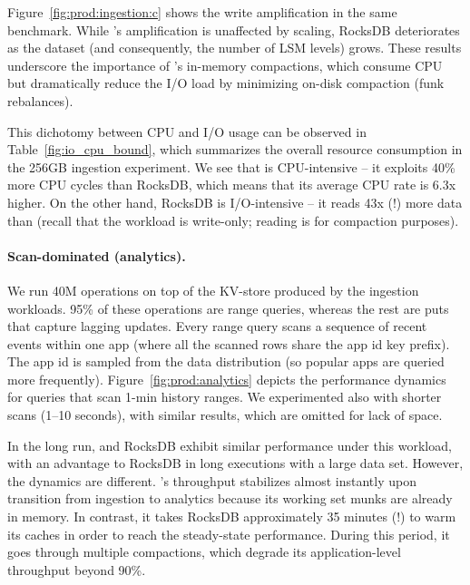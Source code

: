 Figure~\ref{fig:prod:ingestion:c} shows the write amplification in the same benchmark. 
While \sys's amplification is unaffected by  scaling, RocksDB deteriorates as the dataset (and consequently, the number of LSM levels) grows. 
These results underscore the importance of \sys's in-memory compactions, which consume CPU 
but dramatically reduce the I/O load by minimizing on-disk compaction (funk rebalances). 

This dichotomy between CPU and I/O usage can be observed in 
Table~\ref{fig:io_cpu_bound}, which summarizes  the overall resource consumption in the  256GB ingestion
experiment. We see that \sys\/ is CPU-intensive -- it exploits 40\% more CPU cycles than RocksDB, which means that its average CPU rate is 6.3x higher. 
On the other hand, RocksDB is I/O-intensive -- it reads 43x (!) more data than \sys\/ (recall that the workload is write-only; reading is for compaction purposes). 


\paragraph{Scan-dominated (analytics).} We run 40M operations on top of the KV-store produced by the ingestion workloads.
95\% of these operations are range queries, whereas the rest are puts that capture lagging updates. 
Every range query scans a sequence of recent events within one app (where all the scanned rows 
share the  app id key prefix).  
The app id is sampled from the data distribution (so popular apps are queried more frequently).  
Figure~\ref{fig:prod:analytics} depicts the performance dynamics for queries that scan 1-min history ranges.
We experimented also with shorter scans (1--10 seconds), with similar results, which are omitted for lack of space.

In the long run, \sys\/ and RocksDB exhibit similar performance under this workload, with an advantage to RocksDB in long executions with a large data set. 
However, the  dynamics are different. \sys's throughput stabilizes 
almost instantly upon transition from ingestion to analytics because its working set munks are already in memory. 
In contrast, it takes RocksDB approximately 35 minutes (!) to warm its caches in order to reach the steady-state performance. 
During this period, it goes through multiple compactions, which degrade its application-level throughput beyond 90\%. 

